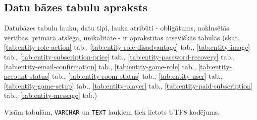 \subsection{Datu bāzes tabulu apraksts}
Datubāzes tabulu lauku, datu tipi, lauka atribūti - obligātums, noklusētās vērtības, primārā atslēga,
unikalitāte - ir aprakstītas atsevišķās tabulās (skat.
\ref{tab:entity-role-action} tab.,
\ref{tab:entity-role-disadvantage} tab.,
\ref{tab:entity-image} tab.,
\ref{tab:entity-subscription-price} tab.,
\ref{tab:entity-password-recovery} tab.,
\ref{tab:entity-email-confirmation} tab.,
\ref{tab:entity-game-role} tab.,
\ref{tab:entity-account-status} tab.,
\ref{tab:entity-room-status} tab.,
\ref{tab:entity-user} tab.,
\ref{tab:entity-game-setup} tab.,
\ref{tab:entity-player} tab.,
\ref{tab:entity-paid-subscription} tab.,
\ref{tab:entity-message} tab.)

Visām tabulām, \texttt{VARCHAR} un \texttt{TEXT} laukiem tiek lietots UTF8 kodējums.


















